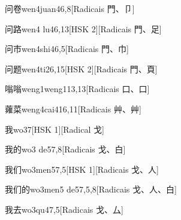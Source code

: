 \begin{entry}{问卷}{wen4juan4}{6,8}[Radicais ⾨、⼙]
\end{entry}

\begin{entry}{问路}{wen4 lu4}{6,13}[HSK 2][Radicais ⾨、⾜]
\end{entry}

\begin{entry}{问市}{wen4shi4}{6,5}[Radicais ⾨、⼱]
\end{entry}

\begin{entry}{问题}{wen4ti2}{6,15}[HSK 2][Radicais ⾨、⾴]
\end{entry}

\begin{entry}{嗡嗡}{weng1weng1}{13,13}[Radicais ⼝、⼝]
\end{entry}

\begin{entry}{蕹菜}{weng4cai4}{16,11}[Radicais ⾋、⾋]
\end{entry}

\begin{entry}{我}{wo3}{7}[HSK 1][Radical ⼽]
\end{entry}

\begin{entry}{我的}{wo3 de5}{7,8}[Radicais ⼽、⽩]
\end{entry}

\begin{entry}{我们}{wo3men5}{7,5}[HSK 1][Radicais ⼽、⼈]
\end{entry}

\begin{entry}{我们的}{wo3men5 de5}{7,5,8}[Radicais ⼽、⼈、⽩]
\end{entry}

\begin{entry}{我去}{wo3qu4}{7,5}[Radicais ⼽、⼛]
\end{entry}

